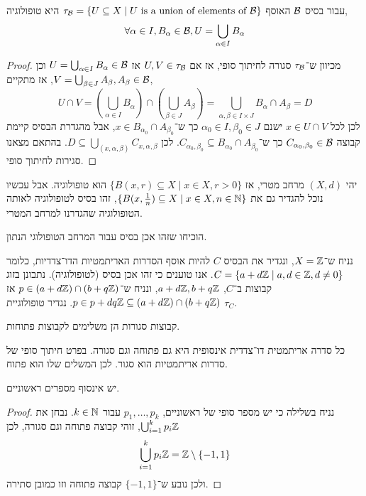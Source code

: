 \begin{proposition}
	עבור בסיס $\mathcal{B}$ האוסף $\tau_{\mathcal{B}} = \{ U \subseteq X \mid U \text{ is a union of elements of } \mathcal{B} \}$ היא טופולוגיה,
	\[
		\forall \alpha \in I, B_\alpha \in \mathcal{B}, U = \bigcup_{\alpha \in I} B_\alpha
	\]
\end{proposition}
\begin{proof}
	מכיוון ש־$\tau_{\mathcal{B}}$ סגורה לחיתוך סופי, אז אם $U, V \in \tau_{\mathcal{B}}$ אז $U = \bigcup_{\alpha \in I} B_\alpha \in \mathcal{B}$ וכן $V = \bigcup_{\beta \in J} A_\beta, A_\beta \in \mathcal{B}$, אז מתקיים,
	\[
		U \cap V
		= (\bigcup_{\alpha \in I} B_\alpha) \cap (\bigcup_{\beta \in J} A_\beta)
		= \bigcup_{\alpha, \beta \in I \times J} B_\alpha \cap A_\beta
		= D
	\]
	לכן לכל $x \in U \cap V$ ישנם $\alpha_0 \in I, \beta_0 \in J$ כך ש־$x \in B_{\alpha_0} \cap A_{\beta_0}$,
	אבל מהגדרת הבסיס קיימת קבוצה $C_{\alpha_0, \beta_0} \in \mathcal{B}$ כך ש־$C_{\alpha_0, \beta_0} \subseteq B_{\alpha_0} \cap A_{\beta_0}$.
	לכן $D \subseteq \bigcup_{(x, \alpha, \beta)} C_{x, \alpha, \beta}$.
	בהתאם מצאנו סגירות לחיתוך סופי.
\end{proof}
\begin{remark}
	יהי $(X, d)$ מרחב מטרי, אז $\{ B(x, r) \subseteq X \mid x \in X, r > 0 \}$ הוא טופולוגיה.
	אבל עכשיו נוכל להגדיר גם את $\{ B(x, \frac{1}{n}) \subseteq X \mid x \in X, n \in \mathbb{N} \}$, זהו בסיס לטופולוגיה לאותה הטופולוגיה שהגדרנו למרחב המטרי.
\end{remark}
\begin{exercise}
	הוכיחו שזהו אכן בסיס עבור המרחב הטופולוגי הנתון.
\end{exercise}
\begin{example}
	נניח ש־$X = \mathbb{Z}$, ונגדיר את הבסיס $C$ להיות אוסף הסדרות האריתמטיות הדו־צדדיות, כלומר $C = \{ a + d \mathbb{Z} \mid a, d \in \mathbb{Z}, d \ne 0 \}$.
	אנו טוענים כי זהו אכן בסיס (לטופולוגיה).
	נתבונן בזוג קבוצות ב־$C$, $a + d \mathbb{Z}, b + q \mathbb{Z}$, ונניח ש־$p \in (a + d \mathbb{Z}) \cap (b + q \mathbb{Z})$ אז $p \in p + dq \mathbb{Z} \subseteq (a + d \mathbb{Z}) \cap (b + q \mathbb{Z})$.
	נגדיר טופולוגיית $\tau_C$.

	קבוצות סגורות הן משלימים לקבוצות פתוחות.

	כל סדרה אריתמטית דו־צדדית אינסופית היא גם פתוחה וגם סגורה.
	בפרט חיתוך סופי של סדרות אריתמטיות הוא סגור.
	לכן המשלים שלו הוא פתוח.
\end{example}
\begin{conclusion}
	יש אינסוף מספרים ראשוניים.
\end{conclusion}
\begin{proof}
	נניח בשלילה כי יש מספר סופי של ראשוניים, $p_1, \dots, p_k$ עבור $k \in \mathbb{N}$.
	נבחן את $\bigcup_{i = 1}^k p_i \mathbb{Z}$, זוהי קבוצה פתוחה וגם סגורה, לכן
	\[
		\bigcup_{i = 1}^k p_i \mathbb{Z}
		= \mathbb{Z} \setminus \{ -1, 1 \}
	\]
	ולכן נובע ש־$\{-1, 1\}$ קבוצה פתוחה וזו כמובן סתירה.
\end{proof}
